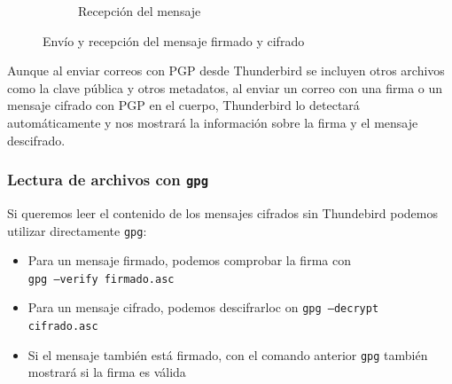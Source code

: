\begin{figure}[H]
\begin{subfigure}{.5\textwidth}
        \caption{Recepción del mensaje}
    \end{subfigure}
    \caption{Envío y recepción del mensaje firmado y cifrado}
\end{figure}

Aunque al enviar correos con PGP desde Thunderbird se incluyen otros archivos como la clave pública y otros metadatos, al enviar un correo con una firma o un mensaje cifrado con PGP en el cuerpo, Thunderbird lo detectará automáticamente y nos mostrará la información sobre la firma y el mensaje descifrado.

\subsubsection{Lectura de archivos con \texttt{gpg}}

Si queremos leer el contenido de los mensajes cifrados sin Thundebird podemos utilizar directamente \texttt{gpg}:

\begin{itemize}
    \item Para un mensaje firmado, podemos comprobar la firma con \\\texttt{gpg --verify firmado.asc}
    \item Para un mensaje cifrado, podemos descifrarloc on \texttt{gpg --decrypt cifrado.asc}
    \item Si el mensaje también está firmado, con el comando anterior \texttt{gpg} también mostrará si la firma es válida
\end{itemize}
